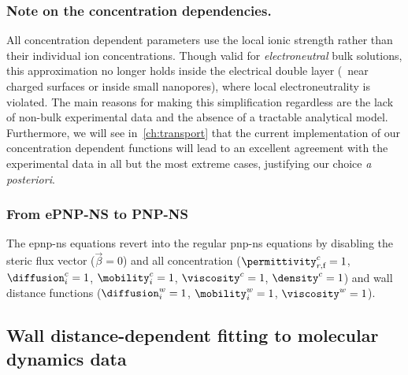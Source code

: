 \subsubsection{Note on the concentration dependencies.}
%

All concentration dependent parameters use the local ionic strength rather than their individual ion
concentrations. Though valid for \emph{electroneutral} bulk solutions, this approximation no longer holds
inside the electrical double layer (\ie~near charged surfaces or inside small nanopores), where local
electroneutrality is violated. The main reasons for making this simplification regardless are the lack of
non-bulk experimental data and the absence of a tractable analytical model. Furthermore, we will see
in~\cref{ch:transport} that the current implementation of our concentration dependent functions will lead to
an excellent agreement with the experimental data in all but the most extreme cases, justifying our choice
\textit{a posteriori}. 

\subsubsection{From {ePNP-NS} to {PNP-NS}}
%

The \gls{epnp-ns} equations revert into the regular \gls{pnp-ns} equations by disabling the steric flux vector
($\vec{\beta}=0$) and all concentration ($\permittivity_{r,\text{f}}^c=1$, $\diffusion_{i}^c=1$,
$\mobility_{i}^c=1$, $\viscosity^c=1$, $\density^c=1$) and wall distance functions ($\diffusion_{i}^w=1$,
$\mobility_{i}^w=1$, $\viscosity^w=1$).

%
\clearpage
%

%
\subsection[Wall distance-dependent fitting to {MD} data]%
           {Wall distance-dependent fitting to molecular dynamics data}
%

